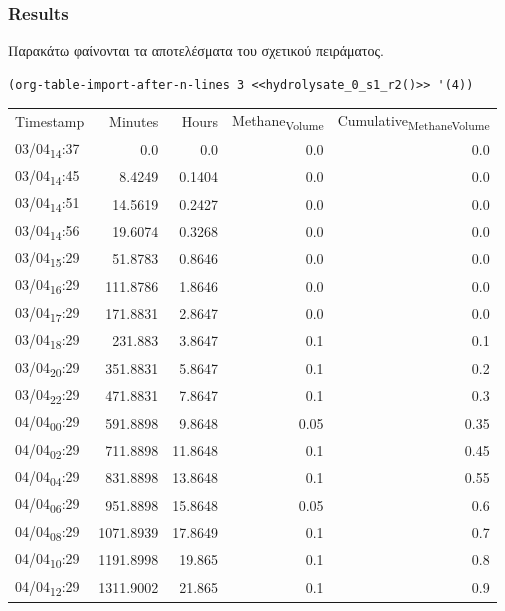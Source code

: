 \documentclass[11pt]{article}
\begin{document}
\subsubsection{Results}
\label{sec:org5efe758}
Παρακάτω φαίνονται τα αποτελέσματα του σχετικού πειράματος.

\begin{verbatim}
(org-table-import-after-n-lines 3 <<hydrolysate_0_s1_r2()>> '(4))
\end{verbatim}

\begin{center}
\begin{tabular}{lrrrr}
Timestamp & Minutes & Hours & Methane\textsubscript{Volume} & Cumulative\textsubscript{Methane}\textsubscript{Volume}\\[0pt]
03/04\textsubscript{14}:37 & 0.0 & 0.0 & 0.0 & 0.0\\[0pt]
03/04\textsubscript{14}:45 & 8.4249 & 0.1404 & 0.0 & 0.0\\[0pt]
03/04\textsubscript{14}:51 & 14.5619 & 0.2427 & 0.0 & 0.0\\[0pt]
03/04\textsubscript{14}:56 & 19.6074 & 0.3268 & 0.0 & 0.0\\[0pt]
03/04\textsubscript{15}:29 & 51.8783 & 0.8646 & 0.0 & 0.0\\[0pt]
03/04\textsubscript{16}:29 & 111.8786 & 1.8646 & 0.0 & 0.0\\[0pt]
03/04\textsubscript{17}:29 & 171.8831 & 2.8647 & 0.0 & 0.0\\[0pt]
03/04\textsubscript{18}:29 & 231.883 & 3.8647 & 0.1 & 0.1\\[0pt]
03/04\textsubscript{20}:29 & 351.8831 & 5.8647 & 0.1 & 0.2\\[0pt]
03/04\textsubscript{22}:29 & 471.8831 & 7.8647 & 0.1 & 0.3\\[0pt]
04/04\textsubscript{00}:29 & 591.8898 & 9.8648 & 0.05 & 0.35\\[0pt]
04/04\textsubscript{02}:29 & 711.8898 & 11.8648 & 0.1 & 0.45\\[0pt]
04/04\textsubscript{04}:29 & 831.8898 & 13.8648 & 0.1 & 0.55\\[0pt]
04/04\textsubscript{06}:29 & 951.8898 & 15.8648 & 0.05 & 0.6\\[0pt]
04/04\textsubscript{08}:29 & 1071.8939 & 17.8649 & 0.1 & 0.7\\[0pt]
04/04\textsubscript{10}:29 & 1191.8998 & 19.865 & 0.1 & 0.8\\[0pt]
04/04\textsubscript{12}:29 & 1311.9002 & 21.865 & 0.1 & 0.9\\[0pt]

\end{tabular}
\end{center}
\end{document}
